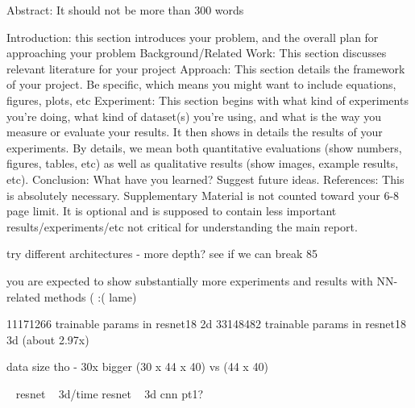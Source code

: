 \documentclass[10pt,twocolumn,letterpaper]{article}
\begin{document}
Abstract: It should not be more than 300 words

Introduction: this section introduces your problem, and the overall plan for approaching your problem
Background/Related Work: This section discusses relevant literature for your project
Approach: This section details the framework of your project. Be specific, which means you might want to include equations, figures, plots, etc
Experiment: This section begins with what kind of experiments you're doing, what kind of dataset(s) you're using, and what is the way you measure or evaluate your results. It then shows in details the results of your experiments. By details, we mean both quantitative evaluations (show numbers, figures, tables, etc) as well as qualitative results (show images, example results, etc).
Conclusion: What have you learned? Suggest future ideas.
References: This is absolutely necessary.
Supplementary Material is not counted toward your 6-8 page limit. It is optional and is supposed to contain less important results/experiments/etc not critical for understanding the main report.

try different architectures - more depth?
see if we can break 85%

you are expected to show substantially more experiments and results with NN-related methods
( :(  lame)

11171266 trainable params in resnet18 2d
33148482 trainable params in resnet18 3d (about 2.97x)

data size tho -
30x bigger (30 x 44 x 40) vs (44 x 40)

~\cite{he2016deep} resnet
~\cite{tran2018closer} 3d/time resnet
~\cite{hara3dcnns} 3d cnn pt1?


{\small


}
\end{document}
